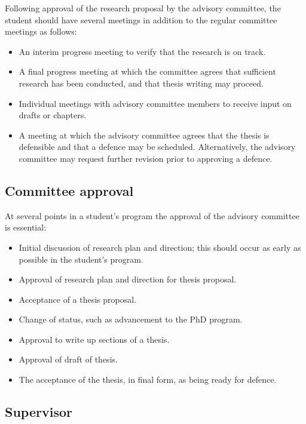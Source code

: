 \documentclass{article}
\begin{document}
Following approval of the research proposal by the advisory committee, the
student should have several meetings in addition to the regular committee
meetings as follows:
\begin{itemize}

\item An interim progress meeting to verify that the research is on track.

\item A final progress meeting at which the committee agrees that sufficient
research has been conducted, and that thesis writing may proceed.

\item Individual meetings with advisory committee members to receive input on drafts or chapters.

\item A meeting at which the advisory committee agrees that the thesis is
defensible and that a defence may be scheduled. Alternatively, the advisory
committee may request further revision prior to approving a defence.

\end{itemize}





\subsection{Committee approval}


At several points in a student's program the approval of the advisory committee is essential:
\begin{itemize}
\item Initial discussion of research plan and direction; this should occur as early as possible in the student's program.
\item Approval of research plan and direction for thesis proposal.
\item Acceptance of a thesis proposal.
\item Change of status, such as advancement to the PhD program.
\item Approval to write up sections of a thesis.
\item Approval of draft of thesis.
\item The acceptance of the thesis, in final form, as being ready for defence.
\end{itemize}


\subsection{Supervisor}
\end{document}
